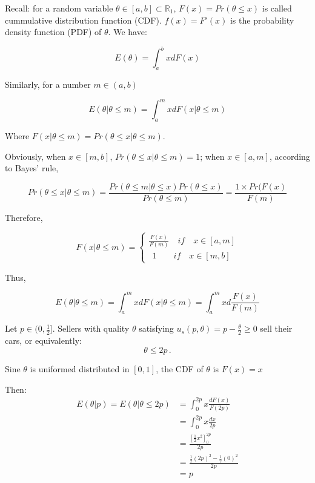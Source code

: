 \documentclass{article}
\newcommand{\R}{\mathbb{R}}
\begin{document}
\begin{mdframed}[backgroundcolor=blue!20,linecolor=white]

Recall: for a random variable $\theta \in [a,b] \subset \R_1$, $F(x) = Pr(\theta\le x)$ is called cummulative distribution function (CDF). $f(x)=F'(x)$ is the probability density function (PDF) of $\theta$. We have:

$$E(\theta) = \int^b_a x dF(x)$$

Similarly, for a number $m \in (a,b)$

$$E(\theta|\theta \le m) = \int^m_a x d F(x|\theta \le m)$$

Where $F(x|\theta \le m) = Pr(\theta \le x | \theta \le m)$. 

\medskip 

Obviously, when $x \in [m,b]$, $Pr(\theta \le x | \theta \le m)=1$; when $x \in [a,m]$, according to Bayes' rule,


 $$Pr(\theta \le x | \theta \le m)= \frac{Pr(\theta \le m | \theta \le x) Pr(\theta \le x)}{Pr(\theta \le m)} = \frac{1 \times Pr(F(x)}{F(m)}$$

Therefore,

\begin{equation}
F(x|\theta \le m)=
    \begin{cases}
\frac{F(x)}{F(m)} \quad if \quad x \in [a,m] \\
\ \ 1 \quad \quad if \quad x \in [m,b] 
    \end{cases}
\nonumber
\end{equation}

Thus,

$$E(\theta|\theta \le m) = \int^m_a x d F(x|\theta \le m)=\int^m_a x d \frac{F(x)}{F(m)}$$
\end{mdframed}

Let $p \in (0,\tfrac12]$. Sellers with quality $\theta$ satisfying $u_s(p,\theta)=p - \tfrac{\theta}2 \geq 0$ sell their cars, or equivalently:$$\theta \leq 2p \, .$$

\medskip

Sine $\theta$ is uniformed distributed in $[0,1]$, the CDF of $\theta$ is $F(x) = x$

\medskip

Then:
\begin{align*}
E(\theta | p) = E(\theta | \theta \leq 2p) &= \int_{0}^{2p}x\frac{dF(x)}{F(2p)} \\
&= \int_{0}^{2p} x\frac{dx}{2p} \\
&= \frac{\left[ \tfrac12 x^2 \right]^{2p}_0}{2p} \\
&= \frac{\tfrac12 (2p)^2 - \tfrac12 (0)^2}{2p} \\
&= p
\end{align*}
\end{document}
